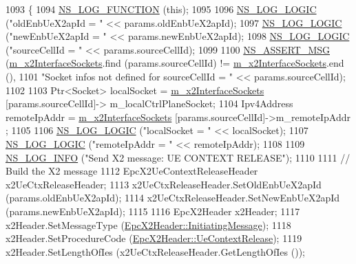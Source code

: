 \begin{DoxyCode}
1093 \{
1094   \hyperlink{log-macros-disabled_8h_a90b90d5bad1f39cb1b64923ea94c0761}{NS\_LOG\_FUNCTION} (\textcolor{keyword}{this});
1095 
1096   \hyperlink{group__logging_ga88acd260151caf2db9c0fc84997f45ce}{NS\_LOG\_LOGIC} (\textcolor{stringliteral}{"oldEnbUeX2apId = "} << params.oldEnbUeX2apId);
1097   \hyperlink{group__logging_ga88acd260151caf2db9c0fc84997f45ce}{NS\_LOG\_LOGIC} (\textcolor{stringliteral}{"newEnbUeX2apId = "} << params.newEnbUeX2apId);
1098   \hyperlink{group__logging_ga88acd260151caf2db9c0fc84997f45ce}{NS\_LOG\_LOGIC} (\textcolor{stringliteral}{"sourceCellId = "} << params.sourceCellId);
1099 
1100   \hyperlink{assert_8h_aff5ece9066c74e681e74999856f08539}{NS\_ASSERT\_MSG} (\hyperlink{classns3_1_1EpcX2_a0665276228b9b99a52ef6d5e9bdb306d}{m\_x2InterfaceSockets}.find (params.sourceCellId) != 
      \hyperlink{classns3_1_1EpcX2_a0665276228b9b99a52ef6d5e9bdb306d}{m\_x2InterfaceSockets}.end (),
1101                  \textcolor{stringliteral}{"Socket infos not defined for sourceCellId = "} << params.sourceCellId);
1102 
1103   Ptr<Socket> localSocket = \hyperlink{classns3_1_1EpcX2_a0665276228b9b99a52ef6d5e9bdb306d}{m\_x2InterfaceSockets} [params.sourceCellId]->
      m\_localCtrlPlaneSocket;
1104   Ipv4Address remoteIpAddr = \hyperlink{classns3_1_1EpcX2_a0665276228b9b99a52ef6d5e9bdb306d}{m\_x2InterfaceSockets} [params.sourceCellId]->m\_remoteIpAddr
      ;
1105 
1106   \hyperlink{group__logging_ga88acd260151caf2db9c0fc84997f45ce}{NS\_LOG\_LOGIC} (\textcolor{stringliteral}{"localSocket = "} << localSocket);
1107   \hyperlink{group__logging_ga88acd260151caf2db9c0fc84997f45ce}{NS\_LOG\_LOGIC} (\textcolor{stringliteral}{"remoteIpAddr = "} << remoteIpAddr);
1108 
1109   \hyperlink{group__logging_gafbd73ee2cf9f26b319f49086d8e860fb}{NS\_LOG\_INFO} (\textcolor{stringliteral}{"Send X2 message: UE CONTEXT RELEASE"});
1110 
1111   \textcolor{comment}{// Build the X2 message}
1112   EpcX2UeContextReleaseHeader x2UeCtxReleaseHeader;
1113   x2UeCtxReleaseHeader.SetOldEnbUeX2apId (params.oldEnbUeX2apId);
1114   x2UeCtxReleaseHeader.SetNewEnbUeX2apId (params.newEnbUeX2apId);
1115 
1116   EpcX2Header x2Header;
1117   x2Header.SetMessageType (\hyperlink{classns3_1_1EpcX2Header_a0e69b043a20eaee4c570f223f4eca715a5761e50c3c1918a44e3a5ebc86f17435}{EpcX2Header::InitiatingMessage});
1118   x2Header.SetProcedureCode (\hyperlink{classns3_1_1EpcX2Header_afd178c1ed3c47948c587955698a15b0dafaf7b3969cec8182c5b3843d2113bbcc}{EpcX2Header::UeContextRelease});
1119   x2Header.SetLengthOfIes (x2UeCtxReleaseHeader.GetLengthOfIes ());

\end{DoxyCode}
